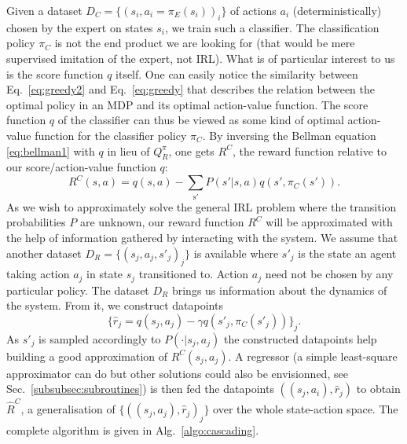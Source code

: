 \documentclass{llncs}
\begin{document}
Given a dataset $D_C = \{(s_i,a_i=\pi_E(s_i))_i\}$ of actions $a_i$ (deterministically) chosen by the expert on states $s_i$, we train such a classifier. The classification policy $\pi_C$ is not the end product we are looking for (that would be mere supervised imitation of the expert, not IRL). What is of particular interest to us is the score function $q$ itself. One can easily notice the similarity between Eq.~\eqref{eq:greedy2} and Eq.~\eqref{eq:greedy} that describes the relation between the optimal policy in an MDP and its optimal action-value function. The score function $q$ of the classifier can thus be viewed as some kind of optimal action-value function for the classifier policy $\pi_C$. By inversing the Bellman equation \eqref{eq:bellman1} with $q$ in lieu of $Q^\pi_R$, one gets $R^C$, the reward function relative to our score/action-value function $q$:
\begin{equation}
  \label{eq:rc}
  R^C(s,a) =q(s,a) - \sum_{\mathrm{s'}}P(s'|s,a)q(s',\pi_C(s')).
\end{equation}
As we wish to approximately solve the general IRL problem where the transition probabilities $P$ are unknown, our reward function $R^C$ will be approximated with the help of information gathered by interacting with the system. We assume that another dataset $D_R = \{(s_j,a_j,s'_j)_j\}$ is available where $s'_j$ is the state an agent taking action $a_j$ in state $s_j$ transitioned to. Action $a_j$ need not be chosen by any particular policy. The dataset $D_R$ brings us information about the dynamics of the system. From it, we construct datapoints
\begin{equation}
  \label{eq:rj}
  \{\hat r_j = q(s_j,a_j) - \gamma q(s'_j,\pi_C(s'_j))\}_j.
\end{equation}
As $s'_j$ is sampled accordingly to $P(\cdot|s_j,a_j)$ the constructed datapoints help building a good approximation of $R^C(s_j,a_j)$. A regressor (a simple least-square approximator can do but other solutions could also be envisionned, see Sec.~\ref{subsubsec:subroutines}) is then fed the datapoints $((s_j,a_i),\hat r_j)$ to obtain $\hat R^C$, a generalisation of $\{((s_j,a_j),\hat r_j)_j\}$ over the whole state-action space. The complete algorithm is given in Alg.~\ref{algo:cascading}.
\end{document}
